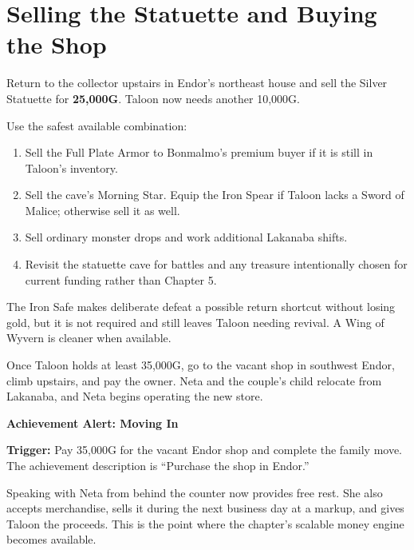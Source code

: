 \documentclass[
  american,
  10pt,
  letterpaper,
  oneside,
  open=any]{scrreprt}
\providecommand{\tightlist}{%
  \setlength{\itemsep}{0pt}\setlength{\parskip}{0pt}}
\begin{document}
\section{Selling the Statuette and Buying the
Shop}\label{selling-the-statuette-and-buying-the-shop}

Return to the collector upstairs in Endor's northeast house and sell the
Silver Statuette for \textbf{25,000G}. Taloon now needs another 10,000G.

Use the safest available combination:

\begin{enumerate}
\def\labelenumi{\arabic{enumi}.}
\tightlist
\item
  Sell the Full Plate Armor to Bonmalmo's premium buyer if it is still
  in Taloon's inventory.
\item
  Sell the cave's Morning Star. Equip the Iron Spear if Taloon lacks a
  Sword of Malice; otherwise sell it as well.
\item
  Sell ordinary monster drops and work additional Lakanaba shifts.
\item
  Revisit the statuette cave for battles and any treasure intentionally
  chosen for current funding rather than Chapter 5.
\end{enumerate}

The Iron Safe makes deliberate defeat a possible return shortcut without
losing gold, but it is not required and still leaves Taloon needing
revival. A Wing of Wyvern is cleaner when available.

Once Taloon holds at least 35,000G, go to the vacant shop in southwest
Endor, climb upstairs, and pay the owner. Neta and the couple's child
relocate from Lakanaba, and Neta begins operating the new store.

\begin{achievementalert}

\textbf{Achievement Alert: Moving In}

\textbf{Trigger:} Pay 35,000G for the vacant Endor shop and complete the
family move. The achievement description is ``Purchase the shop in
Endor.''

\end{achievementalert}

Speaking with Neta from behind the counter now provides free rest. She
also accepts merchandise, sells it during the next business day at a
markup, and gives Taloon the proceeds. This is the point where the
chapter's scalable money engine becomes available.
\end{document}
